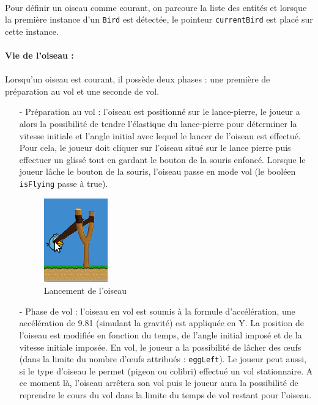 \documentclass[a4paper,12pt]{report}
\begin{document}
\paragraph{}Pour définir un oiseau comme courant, on parcoure la liste des entités et lorsque la première instance d'un \verb+Bird+ est détectée, le pointeur \verb+currentBird+ est placé sur cette instance.

\paragraph{Vie de l'oiseau :}

\paragraph{}Lorsqu'un oiseau est courant, il possède deux phases : une première de préparation au vol et une seconde de vol.

\begin{itemize}
\item[-]Préparation au vol : l'oiseau est positionné sur le lance-pierre, le joueur a alors la possibilité de tendre l’élastique du lance-pierre pour  déterminer la vitesse initiale et l'angle initial avec lequel le lancer de l'oiseau est effectué. Pour cela, le joueur doit cliquer sur l'oiseau situé sur le lance pierre puis effectuer un glissé tout en gardant le bouton de la souris enfoncé. Lorsque le joueur lâche le bouton de la souris, l'oiseau passe en mode vol (le booléen \verb+isFlying+ passe à true).
\begin{figure}[H]
\begin{center}
\includegraphics[scale=1]{images/oiseautendu.png} 
\end{center}
\caption{Lancement de l'oiseau}
\label{Lancement de l'oiseau}
\end{figure}
\item[-]Phase de vol : l'oiseau en vol est soumis à la formule d’accélération, une accélération de 9.81 (simulant la gravité) est appliquée en Y. La position de l'oiseau est modifiée en fonction du temps, de l'angle initial imposé et de la vitesse initiale imposée. En vol, le joueur a la possibilité de lâcher des œufs (dans la limite du nombre d’œufs attribués : \verb+eggLeft+). Le joueur peut aussi, si le type d'oiseau le permet (pigeon ou colibri) effectué un vol stationnaire. A ce moment là, l'oiseau arrêtera son vol puis le joueur aura la possibilité de reprendre le cours du vol  dans la limite du temps de vol restant pour l'oiseau.
\end{itemize}
\end{document}
